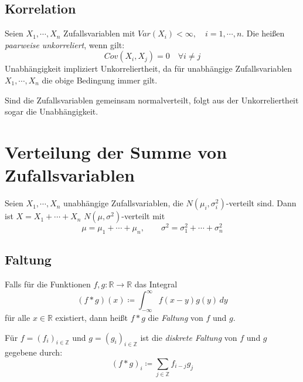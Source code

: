 \documentclass[a4paper, 11pt, accentcolor = tud3b]{tudreport}
\newcommand{\R}{\ensuremath{\mathbb{R}}}
\newcommand{\Var}{\ensuremath{\textit{Var}}}
\newcommand{\Cov}{\ensuremath{\textit{Cov}}}
\begin{document}
            \subsection{Korrelation} %
                Seien \( X_1, \cdots, X_n \) Zufallsvariablen mit \( \Var(X_i) < \infty, \quad i = 1, \cdots, n \). Die heißen \textit{paarweise unkorreliert}, wenn gilt:
                \begin{equation*}
	                \Cov(X_i, X_j) = 0 \quad \forall i \neq j
                \end{equation*}
                Unabhängigkeit impliziert Unkorreliertheit, da für unabhängige Zufallsvariablen \( X_1, \cdots, X_n \) die obige Bedingung immer gilt.
                
                Sind die Zufallsvariablen gemeinsam normalverteilt, folgt aus der Unkorreliertheit sogar die Unabhängigkeit.

        \section{Verteilung der Summe von Zufallsvariablen}
            Seien \( X_1, \cdots, X_n \) unabhängige Zufallsvariablen, die \( N(\mu_i, \sigma_i^2) \)-verteilt sind. Dann ist \( X = X_1 + \cdots + X_n \) \( N(\mu, \sigma^2) \)-verteilt mit
            \begin{equation*}
	            \mu = \mu_1 + \cdots + \mu_n, \qquad \sigma^2 = \sigma_1^2 + \cdots + \sigma_n^2
            \end{equation*}

            \subsection{Faltung}
                Falls für die Funktionen \( f, g : \R \rightarrow \R \) das Integral
                \begin{equation*}
	                (f \ast g)(x) \coloneqq \int_{-\infty}^{\infty} \! f(x - y) g(y) \, dy
                \end{equation*}
                für alle \(x \in \R\) existiert, dann heißt \( f \ast g \) die \textit{Faltung} von \(f\) und \(g\).
                
                Für \( f = (f_i) _ { i \in \mathbb{Z} } \) und \( g = (g_i)_{i \in \mathbb{Z}} \) ist die \textit{diskrete Faltung} von \(f\) und \(g\) gegebene durch:
                \begin{equation*}
	                (f \ast g)_i \coloneqq \sum_{j \in \mathbb{Z}} f_{i - j} g_j
                \end{equation*}
                
\end{document}
